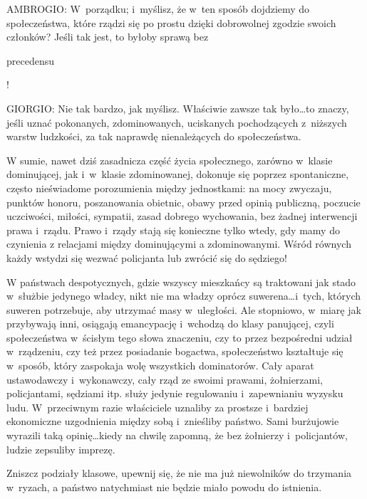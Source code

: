\documentclass[oneside,polish,11pt,sfheadings]{mwbk}
\begin{document}
 
\noindent AMBROGIO: W~porządku; i~myślisz, że w~ten sposób dojdziemy do społeczeństwa, które rządzi się po prostu dzięki
dobrowolnej zgodzie swoich członków? Jeśli tak jest, to byłoby sprawą bez
\begin{itshape}precedensu \end{itshape}! 




 
\noindent GIORGIO: Nie tak bardzo, jak myślisz. Właściwie zawsze tak było\ldots to znaczy, jeśli uznać pokonanych, zdominowanych,
uciskanych pochodzących z~niższych warstw ludzkości, za tak naprawdę nienależących do społeczeństwa. 

 
W sumie, nawet dziś zasadnicza część życia społecznego, zarówno w~klasie dominującej, jak i~w~klasie zdominowanej,
dokonuje się poprzez spontaniczne, często nieświadome porozumienia między jednostkami: na mocy zwyczaju, punktów
honoru, poszanowania obietnic, obawy przed opinią publiczną, poczucie uczciwości, miłości, sympatii, zasad dobrego
wychowania, bez żadnej interwencji prawa i~rządu. Prawo i~rządy stają się konieczne tylko wtedy, gdy mamy do czynienia
z relacjami między dominującymi a zdominowanymi. Wśród równych każdy wstydzi się wezwać policjanta lub zwrócić się do
sędziego! 

 
W państwach despotycznych, gdzie wszyscy mieszkańcy są traktowani jak stado w~służbie jedynego władcy, nikt nie ma
władzy oprócz suwerena\ldots i~tych, których suweren potrzebuje, aby utrzymać masy w~uległości. Ale stopniowo, w~miarę jak
przybywają inni, osiągają emancypację i~wchodzą do klasy panującej, czyli społeczeństwa w~ścisłym tego słowa znaczeniu,
czy to przez bezpośredni udział w~rządzeniu, czy też przez posiadanie bogactwa, społeczeństwo kształtuje się w~sposób,
który zaspokaja wolę wszystkich dominatorów. Cały aparat ustawodawczy i~wykonawczy, cały rząd ze swoimi prawami,
żołnierzami, policjantami, sędziami itp. służy jedynie regulowaniu i~zapewnianiu wyzysku ludu. W~przeciwnym razie
właściciele uznaliby za prostsze i~bardziej ekonomiczne uzgodnienia między sobą i~znieśliby państwo. Sami burżujowie
wyrazili taką opinię\ldots kiedy na chwilę zapomną, że bez żołnierzy i~policjantów, ludzie zepsuliby imprezę. 

 
Zniszcz podziały klasowe, upewnij się, że nie ma już niewolników do trzymania w~ryzach, a państwo natychmiast nie będzie
miało powodu do istnienia. 
\end{document}
